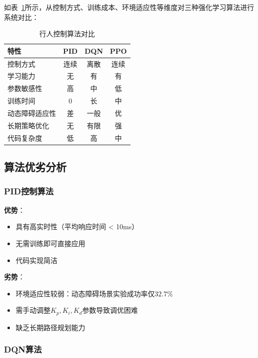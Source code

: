 如表~\ref{tab:algorithm_comparison}所示，从控制方式、训练成本、环境适应性等维度对三种强化学习算法进行系统对比：

\begin{table}[H]
  \centering
  \caption{行人控制算法对比}
  \label{tab:algorithm_comparison}
  \begin{tabular}{lccc}
    \toprule
    \textbf{特性} & \textbf{PID} & \textbf{DQN} & \textbf{PPO} \\
    \midrule
    控制方式 & 连续 & 离散 & 连续 \\
    学习能力 & 无 & 有 & 有 \\
    参数敏感性 & 高 & 中 & 低 \\
    训练时间 & 0 & 长 & 中 \\
    动态障碍适应性 & 差 & 一般 & 优 \\
    长期策略优化 & 无 & 有限 & 强 \\
    代码复杂度 & 低 & 高 & 中 \\
    \bottomrule
  \end{tabular}
\end{table}

\subsection{算法优劣分析}

\subsubsection{PID控制算法}

\textbf{优势}：
\begin{itemize}
  \item 具有高实时性（平均响应时间 < 10ms）
  \item 无需训练即可直接应用
  \item 代码实现简洁
\end{itemize}

\textbf{劣势}：
\begin{itemize}
  \item 环境适应性较弱：动态障碍场景实验成功率仅$32.7\%$
  \item 需手动调整$K_p,K_i,K_d$参数导致调优困难
  \item 缺乏长期路径规划能力
\end{itemize}

\subsubsection{DQN算法}
\label{subsubsec:dqn_analysis}

